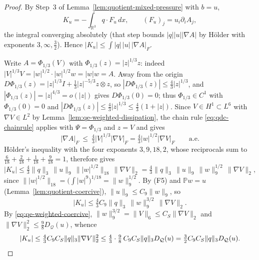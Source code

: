 \documentclass[11pt]{article}
\theoremstyle{definition}
\theoremstyle{plain}
\newcommand{\R}{\mathbb R}
\newcommand{\norm}[1]{\lVert #1\rVert}
\begin{document}
\begin{proof}
By Step~3 of Lemma~\ref{lem:quotient-mixed-pressure} with $b=u$,
\[
 K_u=-\int_{\R^3}q\cdot F_u\,dx,
 \qquad
 (F_u)_j=u_i\partial_iA_j ,
\]
the integral converging absolutely (that step bounds $|q||u||\nabla A|$ by
H\"older with exponents $3,\infty,\frac32$).  Hence
$|K_u|\le\int|q|\,|u|\,|\nabla A|_F$.

Write $A=\Phi_{1/3}(V)$ with $\Phi_{1/3}(z)=|z|^{1/3}z$: indeed
$|V|^{1/3}V=|w|^{1/2}\cdot|w|^{1/2}w=|w|w=A$.  Away from the origin
$D\Phi_{1/3}(z)=|z|^{1/3}I+\frac13|z|^{-5/3}z\otimes z$, so
$|D\Phi_{1/3}(z)|\le\frac43|z|^{1/3}$, and
$|\Phi_{1/3}(z)|=|z|^{4/3}=o(|z|)$ gives $D\Phi_{1/3}(0)=0$; thus
$\Phi_{1/3}\in C^1$ with $\Phi_{1/3}(0)=0$ and
$|D\Phi_{1/3}(z)|\le\frac43|z|^{1/3}\le\frac43(1+|z|)$.  Since
$V\in H^1\subset L^6$ with $\nabla V\in L^2$ by
Lemma~\ref{lem:qe-weighted-dissipation}, the chain rule
\eqref{eq:qdc-chainrule} applies with $\Psi=\Phi_{1/3}$ and $z=V$ and gives
\begin{equation}\label{eq:qe-Agrad-V}
 |\nabla A|_F\ \le\ \tfrac43|V|^{1/3}|\nabla V|_F
 =\tfrac43|w|^{1/2}|\nabla V|_F\qquad\text{a.e.}
\end{equation}
H\"older's inequality with the four exponents $3,9,18,2$, whose reciprocals
sum to $\frac6{18}+\frac2{18}+\frac1{18}+\frac9{18}=1$, therefore gives
\[
 |K_u|\le\tfrac43\norm q_3\,\norm u_9\,\bigl\||w|^{1/2}\bigr\|_{18}\,\norm{\nabla V}_2
 =\tfrac43\norm q_3\,\norm u_9\,\norm w_9^{1/2}\,\norm{\nabla V}_2 ,
\]
since $\bigl\||w|^{1/2}\bigr\|_{18}=\bigl(\int|w|^9\bigr)^{1/18}=\norm w_9^{1/2}$.
By \textup{(F5)} and $\mathbb Pw=u$ (Lemma~\ref{lem:quotient-coercive}),
$\norm u_9\le C_9\norm w_9$, so
\[
 |K_u|\le\tfrac43C_9\norm q_3\,\norm w_9^{3/2}\,\norm{\nabla V}_2 .
\]
By \eqref{eq:qe-weighted-coercive}, $\norm w_9^{3/2}=\norm V_6\le C_S\norm{\nabla V}_2$
and $\norm{\nabla V}_2^2\le\frac98D_{\mathcal Q}(u)$, whence
\[
 |K_u|\le\tfrac43C_9C_S\norm q_3\norm{\nabla V}_2^2
 \le\tfrac43\cdot\tfrac98\,C_9C_S\norm q_3D_{\mathcal Q}(u)
 =\tfrac32C_9C_S\norm q_3D_{\mathcal Q}(u).\qedhere
\]
\end{proof}

\end{document}
